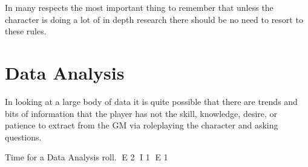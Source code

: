In many respects the most important thing to remember that unless the 
character is doing a lot of in depth research there should be no need 
to resort to these rules.

\section{Data Analysis}

In looking at a large body of data it is quite possible that there 
are trends and bits of information that the player has not the skill, 
knowledge, desire, or patience to extract from the GM via roleplaying 
the character and asking questions. 

Time for a Data Analysis roll.
E 2
I 1
E 1
